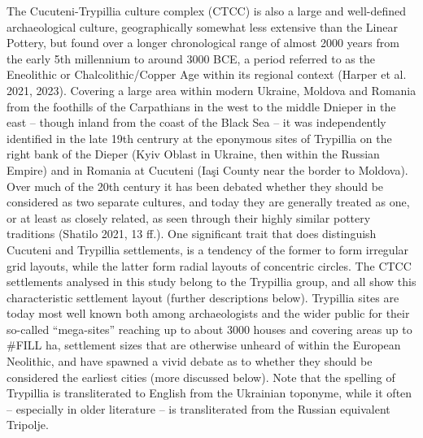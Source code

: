 \documentclass[
  12pt,
  a4paper, twoside]{book}
\begin{document}
The Cucuteni-Trypillia culture complex (CTCC) is also a large and well-defined archaeological culture, geographically somewhat less extensive than the Linear Pottery, but found over a longer chronological range of almost 2000 years from the early 5th millennium to around 3000 BCE, a period referred to as the Eneolithic or Chalcolithic/Copper Age within its regional context (Harper et al. 2021, 2023). Covering a large area within modern Ukraine, Moldova and Romania from the foothills of the Carpathians in the west to the middle Dnieper in the east -- though inland from the coast of the Black Sea -- it was independently identified in the late 19th centrury at the eponymous sites of Trypillia on the right bank of the Dieper (Kyiv Oblast in Ukraine, then within the Russian Empire) and in Romania at Cucuteni (Iaşi County near the border to Moldova). Over much of the 20th century it has been debated whether they should be considered as two separate cultures, and today they are generally treated as one, or at least as closely related, as seen through their highly similar pottery traditions (Shatilo 2021, 13 ff.). One significant trait that does distinguish Cucuteni and Trypillia settlements, is a tendency of the former to form irregular grid layouts, while the latter form radial layouts of concentric circles. The CTCC settlements analysed in this study belong to the Trypillia group, and all show this characteristic settlement layout (further descriptions below). Trypillia sites are today most well known both among archaeologists and the wider public for their so-called ``mega-sites'' reaching up to about 3000 houses and covering areas up to \#FILL ha, settlement sizes that are otherwise unheard of within the European Neolithic, and have spawned a vivid debate as to whether they should be considered the earliest cities (more discussed below). Note that the spelling of Trypillia is transliterated to English from the Ukrainian toponyme, while it often -- especially in older literature -- is transliterated from the Russian equivalent Tripolje.
\end{document}
